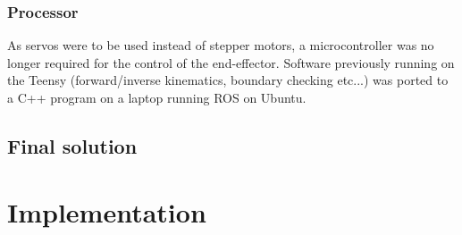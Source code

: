 \documentclass[conference]{IEEEtran}
\begin{document}
\subsubsection{Processor}
As servos were to be used instead of stepper motors, a microcontroller was no longer required for the control of the end-effector. Software previously running on the Teensy (forward/inverse kinematics, boundary checking etc...) was ported to a C++ program on a laptop running ROS on Ubuntu. 
\subsection{Final solution}


\section{Implementation}
\end{document}
